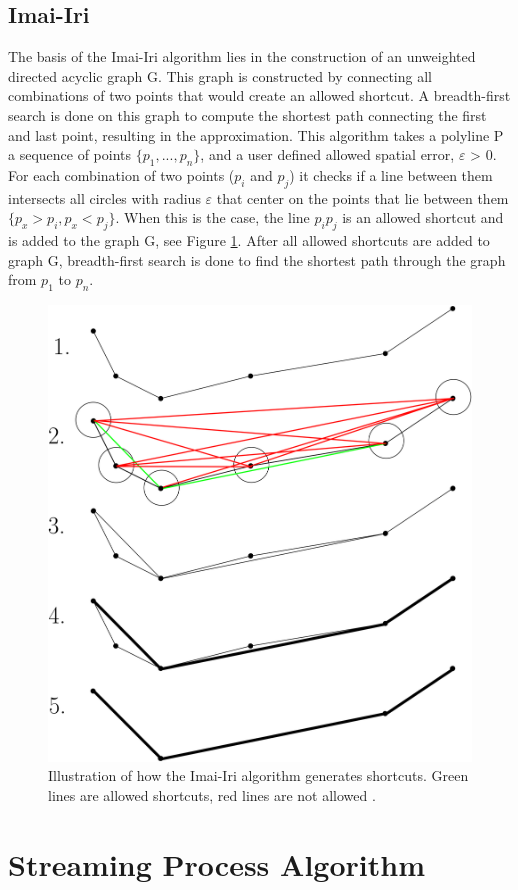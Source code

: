\documentclass[twoside,12pt, a4paper]{report}
\begin{document}
\subsection{Imai-Iri}
The basis of the Imai-Iri algorithm \cite{IMAI198631} lies in the construction
of an unweighted directed acyclic graph G.
This graph is constructed by connecting all combinations
of two points that would create an allowed shortcut.
A breadth-first search is done on this graph to
compute the shortest path connecting the first and last
point, resulting in the approximation.
This algorithm takes a polyline P a sequence of
points $\{p_{1},..., p_{n}\}$, and a user defined allowed spatial
error, $\varepsilon $ > 0. For each combination of two points ($p_{i}$ and $p_{j}$) it checks if a line between them intersects all
circles with radius $\varepsilon $ that center on the points that lie{\tiny {\tiny }}
between them $\{p_{x} > p_{i},p_{x} < p_{j}\}$. When this is the
case, the line $p_{i}p_{j}$ is an allowed shortcut and is added
to the graph G, see Figure \ref{fig:imai}. After all allowed shortcuts
are added to graph G, breadth-first search is done
to find the shortest path through the graph from $p_{1}$ to $p_{n}$.

\begin{figure}[!h]
    \centering
    \includegraphics[width=0.5\linewidth]{figures/imaiiri.png}
    \caption{Illustration of how the Imai-Iri algorithm generates
shortcuts. Green lines are allowed shortcuts, red
lines are not allowed \cite{van2017extensive}.}
    \label{fig:imai}
\end{figure}

\newpage

\section{Streaming Process Algorithm}
\end{document}
